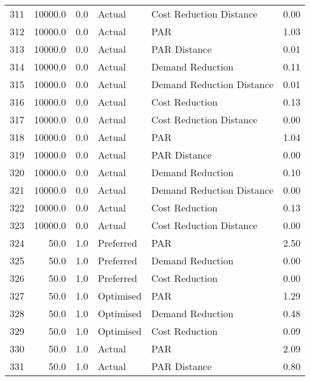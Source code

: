 \begin{longtable}{lrrllr}
311  &      10000.0 &     0.0 &         Actual &    Cost Reduction Distance &   0.00 \\
312  &      10000.0 &     0.0 &         Actual &                        PAR &   1.03 \\
313  &      10000.0 &     0.0 &         Actual &               PAR Distance &   0.01 \\
314  &      10000.0 &     0.0 &         Actual &           Demand Reduction &   0.11 \\
315  &      10000.0 &     0.0 &         Actual &  Demand Reduction Distance &   0.01 \\
316  &      10000.0 &     0.0 &         Actual &             Cost Reduction &   0.13 \\
317  &      10000.0 &     0.0 &         Actual &    Cost Reduction Distance &   0.00 \\
318  &      10000.0 &     0.0 &         Actual &                        PAR &   1.04 \\
319  &      10000.0 &     0.0 &         Actual &               PAR Distance &   0.00 \\
320  &      10000.0 &     0.0 &         Actual &           Demand Reduction &   0.10 \\
321  &      10000.0 &     0.0 &         Actual &  Demand Reduction Distance &   0.00 \\
322  &      10000.0 &     0.0 &         Actual &             Cost Reduction &   0.13 \\
323  &      10000.0 &     0.0 &         Actual &    Cost Reduction Distance &   0.00 \\
324  &         50.0 &     1.0 &      Preferred &                        PAR &   2.50 \\
325  &         50.0 &     1.0 &      Preferred &           Demand Reduction &   0.00 \\
326  &         50.0 &     1.0 &      Preferred &             Cost Reduction &   0.00 \\
327  &         50.0 &     1.0 &      Optimised &                        PAR &   1.29 \\
328  &         50.0 &     1.0 &      Optimised &           Demand Reduction &   0.48 \\
329  &         50.0 &     1.0 &      Optimised &             Cost Reduction &   0.09 \\
330  &         50.0 &     1.0 &         Actual &                        PAR &   2.09 \\
331  &         50.0 &     1.0 &         Actual &               PAR Distance &   0.80 \\

\end{longtable}
